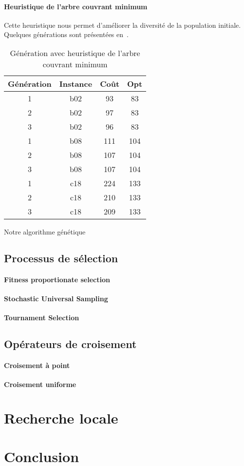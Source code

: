 \documentclass[10pt]{article}
\begin{document}
		\paragraph{Heuristique de l'arbre couvrant minimum}{
		Cette heuristique nous permet d'améliorer la diversité de la population initiale. Quelques générations sont présentées en~.
		
		\begin{table}[h!]
			\centering
			\begin{tabular}{|c|c|c|c|}
				\hline
				\textbf{Génération} & \textbf{Instance} & \textbf{Coût} & \textbf{Opt} \\
				\hline
				1&b02  & 93  &83 \\
				2&b02  & 97   &83\\
				3&b02  & 96  &83 \\
				1&b08  & 111  &104\\
				2&b08  & 107  &104\\
				3&b08  & 107  &104\\
				1&c18  & 224  &133\\
				2&c18  & 210  &133\\
				3&c18  & 209  &133\\
				\hline
			\end{tabular}
			\caption{Génération avec heuristique de l'arbre couvrant minimum}
			\label{tab-mstinit}
		\end{table}
		}
		
		Notre algorithme génétique 

	\subsection{Processus de sélection}
			
		\paragraph{Fitness proportionate selection}{}
		\paragraph{Stochastic Universal Sampling}{}
		\paragraph{Tournament Selection}{}
	\subsection{Opérateurs de croisement}
		\paragraph{Croisement à point}{}
		\paragraph{Croisement uniforme}{}
	
	
\section{Recherche locale}
\section{Conclusion}
	
\end{document}
